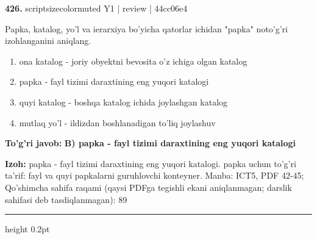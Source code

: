 \documentclass[10pt,a4paper]{article}
\begin{document}
{\bfseries\sffamily\color{ink} 426.} {scriptsizecolor{muted} Y1 | review | 44cc06e4}
\par
Papka, katalog, yo'l va ierarxiya bo'yicha qatorlar ichidan "papka" noto'g'ri izohlanganini aniqlang.
\begin{enumerate}[label=\Alph*),leftmargin=9mm]
\item ona katalog - joriy obyektni bevosita o'z ichiga olgan katalog
\item papka - fayl tizimi daraxtining eng yuqori katalogi
\item quyi katalog - boshqa katalog ichida joylashgan katalog
\item mutlaq yo'l - ildizdan boshlanadigan to'liq joylashuv
\end{enumerate}
\begin{tcolorbox}[enhanced,breakable,colback=teal!4,colframe=teal!60!black,boxrule=0.45pt,arc=1.2mm,left=2.7mm,right=2.7mm,top=1.8mm,bottom=1.8mm,before skip=2mm,after skip=2mm]
{\bfseries\sffamily\color{teal}To'g'ri javob:} \textbf{B) papka - fayl tizimi daraxtining eng yuqori katalogi}
\par\smallskip
{\bfseries Izoh:} papka - fayl tizimi daraxtining eng yuqori katalogi. papka uchun to'g'ri ta'rif: fayl va quyi papkalarni guruhlovchi konteyner. Manba: ICT5, PDF 42-45; Qo'shimcha sahifa raqami (qaysi PDFga tegishli ekani aniqlanmagan; darslik sahifasi deb tasdiqlanmagan): 89
\end{tcolorbox}
\vspace{2mm}\hrule height 0.2pt\vspace{3mm}
\end{document}
